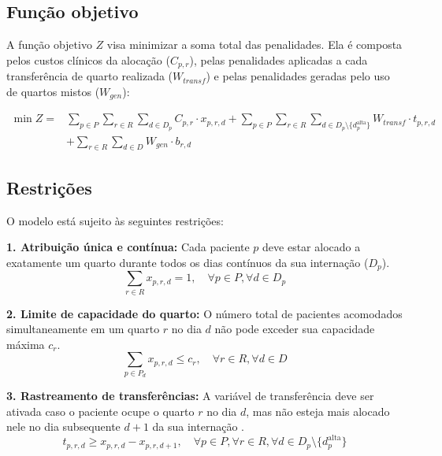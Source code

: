 \subsection{Função objetivo}
A função objetivo $Z$ visa minimizar a soma total das penalidades. Ela é composta pelos custos clínicos da alocação ($C_{p,r}$), pelas penalidades aplicadas a cada transferência de quarto realizada ($W_{transf}$) e pelas penalidades geradas pelo uso de quartos mistos ($W_{gen}$):


\begin{equation}
\begin{split}
\min Z = {} & \sum_{p \in P} \sum_{r \in R} \sum_{d \in D_p} C_{p,r} \cdot x_{p,r,d} + \sum_{p \in P} \sum_{r \in R} \sum_{d \in D_p \setminus \{d^{\text{alta}}_p\}} W_{transf} \cdot t_{p,r,d} \\
& + \sum_{r \in R} \sum_{d \in D} W_{gen} \cdot b_{r,d}
\end{split}
\label{eq:objetivo}
\end{equation}


\subsection{Restrições}

O modelo está sujeito às seguintes restrições:

\textbf{1. Atribuição única e contínua:} Cada paciente $p$ deve estar alocado a exatamente um quarto durante todos os dias contínuos da sua internação ($D_p$).
\begin{equation}
\sum_{r \in R} x_{p,r,d} = 1, \quad \forall p \in P, \forall d \in D_p
\label{eq:atribuicao-unica}
\end{equation}

\textbf{2. Limite de capacidade do quarto:} O número total de pacientes acomodados simultaneamente em um quarto $r$ no dia $d$ não pode exceder sua capacidade máxima $c_r$.
\begin{equation}
\sum_{p \in P_d} x_{p,r,d} \leq c_r, \quad \forall r \in R, \forall d \in D
\label{eq:capacidade}
\end{equation}

\textbf{3. Rastreamento de transferências:} A variável de transferência deve ser ativada caso o paciente ocupe o quarto $r$ no dia $d$, mas não esteja mais alocado nele no dia subsequente $d+1$ da sua internação \cite{ceschia2011local}.
\begin{equation}
t_{p,r,d} \geq x_{p,r,d} - x_{p,r,d+1}, \quad \forall p \in P, \forall r \in R, \forall d \in D_p  \setminus \{d^{\text{alta}}_p \}
\label{eq:transferencia}
\end{equation}

